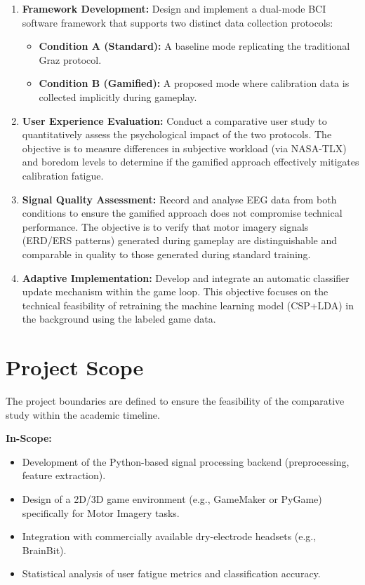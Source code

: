 \documentclass[a4paper, 11pt, openany]{report}
\begin{document}
    \begin{enumerate}
        \item \textbf{Framework Development:} Design and implement a dual-mode 
        BCI software framework that supports two distinct data collection protocols:
        \begin{itemize}
            \item \textbf{Condition A (Standard):} A baseline mode replicating the traditional Graz protocol.
            \item \textbf{Condition B (Gamified):} A proposed mode where calibration data is collected implicitly during gameplay.
        \end{itemize}
        
        \item \textbf{User Experience Evaluation:} Conduct a comparative user study 
        to quantitatively assess the psychological impact of the two protocols. 
        The objective is to measure differences in subjective workload 
        (via NASA-TLX) and boredom levels to determine if the gamified 
        approach effectively mitigates calibration fatigue.
        
        \item \textbf{Signal Quality Assessment:} Record and analyse EEG data 
        from both conditions to ensure the gamified approach does not compromise 
        technical performance. The objective is to verify that motor imagery 
        signals (ERD/ERS patterns) generated during gameplay are distinguishable 
        and comparable in quality to those generated during standard training.
        
        \item \textbf{Adaptive Implementation:} Develop and integrate an 
        automatic classifier update mechanism within the game loop. 
        This objective focuses on the technical feasibility of retraining the 
        machine learning model (CSP+LDA) in the background using the labeled 
        game data.
    \end{enumerate}
        
    \section{Project Scope}    
    The project boundaries are defined to ensure the feasibility of the 
    comparative study within the academic timeline.
    
    \textbf{In-Scope:}
    \begin{itemize}
        \item Development of the Python-based signal processing backend (preprocessing, feature extraction).
        \item Design of a 2D/3D game environment (e.g., GameMaker or PyGame) specifically for Motor Imagery tasks.
        \item Integration with commercially available dry-electrode headsets (e.g., BrainBit).
        \item Statistical analysis of user fatigue metrics and classification accuracy.
    \end{itemize}
    
\end{document}
